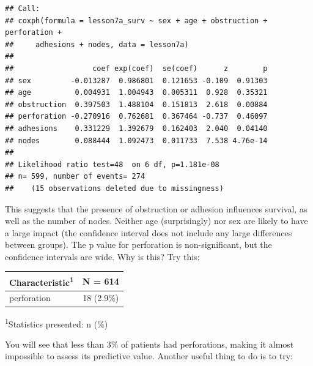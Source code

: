 \documentclass[]{book}
\newenvironment{Shaded}{\begin{snugshade}}{\end{snugshade}}
\newcommand{\KeywordTok}[1]{\textcolor[rgb]{0.13,0.29,0.53}{\textbf{#1}}}
\newcommand{\NormalTok}[1]{#1}
\newcommand{\OperatorTok}[1]{\textcolor[rgb]{0.81,0.36,0.00}{\textbf{#1}}}
\newcommand{\StringTok}[1]{\textcolor[rgb]{0.31,0.60,0.02}{#1}}
\begin{document}
\begin{verbatim}
## Call:
## coxph(formula = lesson7a_surv ~ sex + age + obstruction + perforation + 
##     adhesions + nodes, data = lesson7a)
## 
##                  coef exp(coef)  se(coef)      z        p
## sex         -0.013287  0.986801  0.121653 -0.109  0.91303
## age          0.004931  1.004943  0.005311  0.928  0.35321
## obstruction  0.397503  1.488104  0.151813  2.618  0.00884
## perforation -0.270916  0.762681  0.367464 -0.737  0.46097
## adhesions    0.331229  1.392679  0.162403  2.040  0.04140
## nodes        0.088444  1.092473  0.011733  7.538 4.76e-14
## 
## Likelihood ratio test=48  on 6 df, p=1.181e-08
## n= 599, number of events= 274 
##    (15 observations deleted due to missingness)
\end{verbatim}

This suggests that the presence of obstruction or adhesion influences survival, as well as the number of nodes. Neither age (surprisingly) nor sex are likely to have a large impact (the confidence interval does not include any large differences between groups). The p value for perforation is non-significant, but the confidence intervals are wide. Why is this? Try this:

\begin{Shaded}
\end{Shaded}

\captionsetup[table]{labelformat=empty,skip=1pt}
\begin{longtable}{lc}
\toprule
\textbf{Characteristic}\textsuperscript{1} & \textbf{N = 614} \\ 
\midrule
perforation & 18 (2.9\%) \\ 
\bottomrule
\end{longtable}
\vspace{-5mm}
\begin{minipage}{\linewidth}
\textsuperscript{1}Statistics presented: n (\%) \\ 
\end{minipage}

You will see that less than 3\% of patients had perforations, making it almost impossible to assess its predictive value. Another useful thing to do is to try:

\begin{Shaded}
\end{Shaded}
\end{document}
